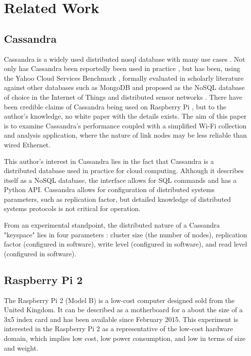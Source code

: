 
\chapter{Related Work} %

\label{Chapter2}
\label{Related Work}%

\section{Cassandra}
Cassandra is a widely used distributed \gls{nosql} database with many use cases \cite{Lakshman2010CassandraSystem}.
Not only has Cassandra been reportedly been used in practice \cite{ApacheCases}, but has been, using the Yahoo Cloud Services Benchmark \cite{YahooBenchmark}, formally evaluated in scholarly literature against other databases such as MongoDB and proposed as the NoSQL database of choice in the Internet of Things and distributed sensor networks \cite{Abramova2013NoSQLCassandra}.
There have been credible claims of Cassandra being used on Raspberry Pi \cite{VanRyswykMulti-DatacenterPis,SercelCassandraMedium}, but to the author's knowledge, no white paper with the details exists.
The aim of this paper is to examine Cassandra's performance coupled with a simplified Wi-Fi collection and analysis application, where the nature of link nodes may be less reliable than wired Ethernet.

This author's interest in Cassandra lies in the fact that Cassandra is a distributed database used in practice for cloud computing.
Although it describes itself as a NoSQL database, the interface allows for SQL commands and has a Python API.
Cassandra allows for configuration of distributed systems parameters, such as replication factor, but detailed knowledge of distributed systems protocols is not critical for operation.

From an experimental standpoint, the distributed nature of a Cassandra "keyspace" lies in four parameters \cite{CassandraDummies}: cluster size (the number of nodes), replication factor (configured in software), write level (configured in software), and read level (configured in software).

\section{Raspberry Pi 2}
The Raspberry Pi 2 (Model B) \cite{RaspberryB} is a low-cost computer designed sold from the United Kingdom.
It can be described as a motherboard for a about the size of a 3x5 index card and has been available since February 2015.
This experiment is interested in the Raspberry Pi 2 as a representative of the low-cost hardware domain, which implies low cost, low power consumption, and low in terms of size and weight.

